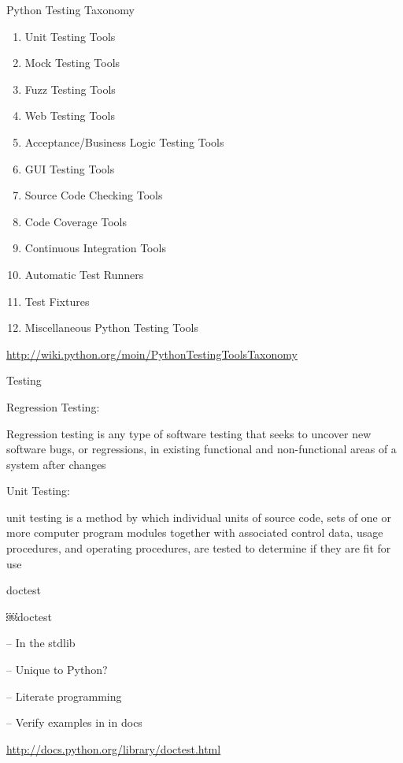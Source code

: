 \documentclass{beamer}
\begin{document}
\begin{frame}[fragile]{Python Testing Taxonomy}

\begin{enumerate}
  \item   Unit Testing Tools
  \item    Mock Testing Tools
  \item    Fuzz Testing Tools
  \item    Web Testing Tools
  \item    Acceptance/Business Logic Testing Tools
  \item    GUI Testing Tools
  \item    Source Code Checking Tools
  \item    Code Coverage Tools
  \item    Continuous Integration Tools
  \item    Automatic Test Runners
  \item    Test Fixtures
  \item    Miscellaneous Python Testing Tools
\end{enumerate}

\vfill
\url{http://wiki.python.org/moin/PythonTestingToolsTaxonomy}

\end{frame} 


\begin{frame}[fragile]{Testing}

\vfill
{\LARGE Regression Testing:}

\vfill
{\Large Regression testing is any type of software testing that seeks to
uncover new software bugs, or regressions, in existing functional and
non-functional areas of a system after changes}

\vfill
{\LARGE Unit Testing:}

\vfill
{\Large unit testing is a method by which individual units of source code,
sets of one or more computer program modules together with associated control
data, usage procedures, and operating procedures, are tested to determine if
they are fit for use}

\vfill

\end{frame} 


\begin{frame}[fragile]{doctest}

{\LARGE￼doctest}

\vfill
{\Large \vspace{0.3in} -- In the stdlib}

\vfill
{\Large \vspace{0.3in} -- Unique to Python?}

\vfill
{\Large \vspace{0.3in} -- Literate programming}

\vfill
{\Large \vspace{0.3in} -- Verify examples in in docs}

\vfill
\url{http://docs.python.org/library/doctest.html}


\end{frame} 
\end{document}
